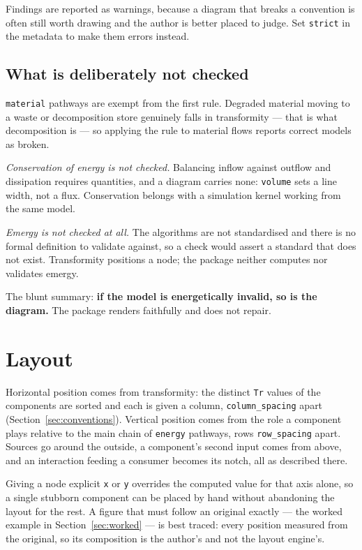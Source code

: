 \documentclass{article}
\begin{document}
Findings are reported as warnings, because a diagram that breaks a convention is
often still worth drawing and the author is better placed to judge. Set
\texttt{strict} in the metadata to make them errors instead.

\subsection{What is deliberately not checked}

\texttt{material} pathways are exempt from the first rule. Degraded material
moving to a waste or decomposition store genuinely falls in transformity --- that
is what decomposition is --- so applying the rule to material flows reports
correct models as broken.

\emph{Conservation of energy is not checked.} Balancing inflow against outflow
and dissipation requires quantities, and a diagram carries none: \texttt{volume}
sets a line width, not a flux. Conservation belongs with a simulation kernel
working from the same model.

\emph{Emergy is not checked at all.} The algorithms are not standardised and
there is no formal definition to validate against, so a check would assert a
standard that does not exist. Transformity positions a node; the package neither
computes nor validates emergy.

The blunt summary: \textbf{if the model is energetically invalid, so is the
diagram.} The package renders faithfully and does not repair.

\section{Layout}

Horizontal position comes from transformity: the distinct \texttt{Tr} values of
the components are sorted and each is given a column, \texttt{column\_spacing}
apart (Section~\ref{sec:conventions}). Vertical position comes from the role a
component plays relative to the main chain of \texttt{energy} pathways, rows
\texttt{row\_spacing} apart. Sources go around the outside, a component's second
input comes from above, and an interaction feeding a consumer becomes its notch,
all as described there.

Giving a node explicit \texttt{x} or \texttt{y} overrides the computed value for
that axis alone, so a single stubborn component can be placed by hand without
abandoning the layout for the rest. A figure that must follow an original
exactly --- the worked example in Section~\ref{sec:worked} --- is best traced:
every position measured from the original, so its composition is the author's
and not the layout engine's.
\end{document}
